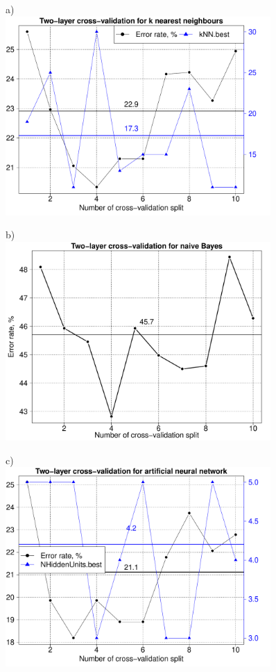 \documentclass[10pt, paper=a4]{article}
\begin{document}
\begin{figure}[h!]
  \begin{minipage}{0.49\textwidth}
    a)\\
    \includegraphics[width = 0.9\textwidth]{k_nearest_neighbors_CV2.pdf}
  \end{minipage} \hfill
  \begin{minipage}{0.49\textwidth}
    b)\\
    \includegraphics[width = 0.9\textwidth]{naive_bayes_CV1.pdf}
  \end{minipage} \vfill
  \begin{minipage}{0.49\textwidth}
    c)\\
    \includegraphics[width = 0.9\textwidth]{artificial_neural_network_CV2.pdf}

\end{minipage}
\end{figure}
\end{document}

